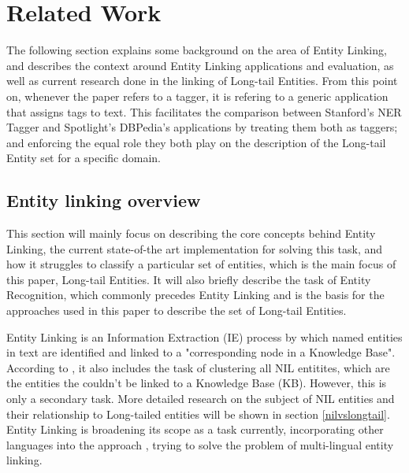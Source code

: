 

\section{Related Work} %
The following section explains some background on the area of Entity Linking,
and describes the context around Entity Linking applications and evaluation,
as well as current research done in the linking of Long-tail Entities.
From this point on, whenever the paper refers to a tagger, it is refering to a generic application that assigns tags to text.
This facilitates the comparison between Stanford's NER Tagger and Spotlight's DBPedia's applications by treating them both as taggers;
and enforcing the equal role they both play on the description of the Long-tail Entity set for a specific domain.

\subsection{Entity linking overview} %

This section will mainly focus on describing the core concepts behind Entity Linking, the current state-of-the art implementation for solving this task, and how it struggles to classify a particular set of entities, which is the main focus of this paper, Long-tail Entities.
It will also briefly describe the task of Entity Recognition, which commonly precedes Entity Linking and is the basis for the approaches used in this paper to describe the set of Long-tail Entities.

Entity Linking is an Information Extraction (IE) process by which named entities in text are identified and linked to a
"corresponding node in a Knowledge Base"\cite{rw_elo_HACHEY2013130}. 
According to \cite{silone}, it also includes the task of clustering all NIL entitites, which are the entities the couldn't be linked to a Knowledge Base (KB).
However, this is only a secondary task. More detailed research on the subject of NIL entities and their relationship to Long-tailed entities will be shown
in section \ref{nilvslongtail}.
Entity Linking is broadening its scope as a task currently, incorporating other languages into the approach \cite{silone}, trying to solve the problem
of multi-lingual entity linking. 

